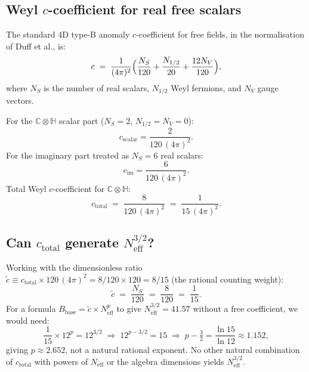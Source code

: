 \documentclass[11pt,a4paper]{article}
\theoremstyle{definition}
\theoremstyle{remark}
\begin{document}
\subsection{Weyl $c$-coefficient for real free scalars}

The standard 4D type-B anomaly $c$-coefficient for free fields, in the
normalisation of Duff et al., is:
\begin{equation}
  c
  \;=\; \frac{1}{(4\pi)^2}
  \Bigl(\frac{N_S}{120} + \frac{N_{1/2}}{20} + \frac{12 N_V}{120}\Bigr),
  \label{eq:c_def}
\end{equation}
where $N_S$ is the number of real scalars, $N_{1/2}$ Weyl fermions,
and $N_V$ gauge vectors.

For the $\mathbb{C}\otimes\mathbb{H}$ scalar part ($N_S = 2$, $N_{1/2} = N_V = 0$):
\begin{equation}
  c_{\text{scalar}} = \frac{2}{120\,(4\pi)^2}.
  \label{eq:c_scalar}
\end{equation}
For the imaginary part treated as $N_S = 6$ real scalars:
\begin{equation}
  c_{\text{im}} = \frac{6}{120\,(4\pi)^2}.
  \label{eq:c_im}
\end{equation}
Total Weyl $c$-coefficient for $\mathbb{C}\otimes\mathbb{H}$:
\begin{equation}
  c_{\mathrm{total}}
  \;=\; \frac{8}{120\,(4\pi)^2}
  \;=\; \frac{1}{15\,(4\pi)^2}.
  \label{eq:c_total}
\end{equation}

\subsection{Can $c_{\mathrm{total}}$ generate $N_{\mathrm{eff}}^{3/2}$?}

Working with the dimensionless ratio $\tilde{c} \equiv c_{\mathrm{total}} \times
120\,(4\pi)^2 = 8/120 \times 120 = 8/15$ (the rational counting weight):
\begin{equation}
  \tilde{c}
  \;=\; \frac{N_S}{120}
  \;=\; \frac{8}{120}
  \;=\; \frac{1}{15}.
  \label{eq:c_tilde}
\end{equation}
For a formula $B_{\mathrm{base}} = \tilde{c} \times N_{\mathrm{eff}}^p$
to give $N_{\mathrm{eff}}^{3/2} = 41.57$ without a free coefficient,
we would need:
\begin{equation}
  \frac{1}{15} \times 12^p = 12^{3/2}
  \;\Longrightarrow\;
  12^{p - 3/2} = 15
  \;\Longrightarrow\;
  p - \tfrac{3}{2} = \frac{\ln 15}{\ln 12} \approx 1.152,
  \label{eq:p_G2}
\end{equation}
giving $p \approx 2.652$, not a natural rational exponent.
No other natural combination of $c_{\mathrm{total}}$ with powers of
$N_{\mathrm{eff}}$ or the algebra dimensions yields $N_{\mathrm{eff}}^{3/2}$.
\end{document}
